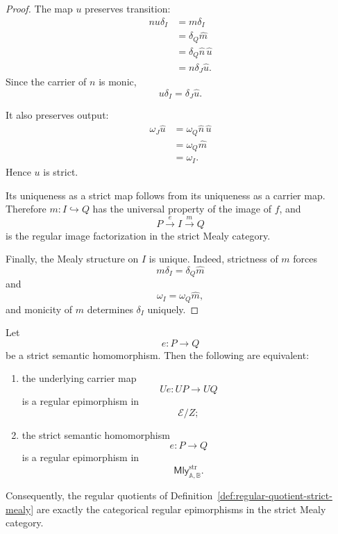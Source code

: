 \begin{proof}
    The map \(u\) preserves transition:
    \[
    \begin{aligned}
        nu\delta_I
        &=
        m\delta_I
        \\
        &=
        \delta_Q\widehat m
        \\
        &=
        \delta_Q\widehat n\,\widehat u
        \\
        &=
        n\delta_J\widehat u.
    \end{aligned}
    \]
    Since the carrier of \(n\) is monic,
    \[
        u\delta_I
        =
        \delta_J\widehat u.
    \]

    It also preserves output:
    \[
    \begin{aligned}
        \omega_J\widehat u
        &=
        \omega_Q\widehat n\,\widehat u
        \\
        &=
        \omega_Q\widehat m
        \\
        &=
        \omega_I.
    \end{aligned}
    \]
    Hence \(u\) is strict.

    Its uniqueness as a strict map follows from its uniqueness as a carrier
    map. Therefore \(m:I\hookrightarrow Q\) has the universal property of the
    image of \(f\), and
    \[
        P\xrightarrow{e}I\xrightarrow{m}Q
    \]
    is the regular image factorization in the strict Mealy category.

    Finally, the Mealy structure on \(I\) is unique. Indeed, strictness of
    \(m\) forces
    \[
        m\delta_I=\delta_Q\widehat m
    \]
    and
    \[
        \omega_I=\omega_Q\widehat m,
    \]
    and monicity of \(m\) determines \(\delta_I\) uniquely.
\end{proof}

\begin{corollary}
\label{cor:carrier-regular-quotients-categorical}
    Let
    \[
        e:P\to Q
    \]
    be a strict semantic homomorphism. Then the following are equivalent:
    \begin{enumerate}
        \item the underlying carrier map
        \[
            Ue:UP\to UQ
        \]
        is a regular epimorphism in
        \[
            \mathcal E/Z;
        \]

        \item the strict semantic homomorphism
        \[
            e:P\to Q
        \]
        is a regular epimorphism in
        \[
            \mathsf{Mly}^{\mathrm{str}}_{\mathbb A,\mathbb B}.
        \]
    \end{enumerate}

    Consequently, the regular quotients of
    Definition~\ref{def:regular-quotient-strict-mealy} are exactly the
    categorical regular epimorphisms in the strict Mealy category.
\end{corollary}

